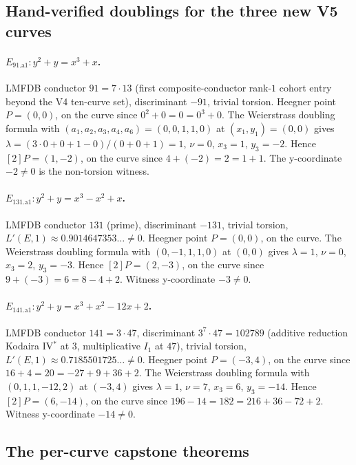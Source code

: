 \documentclass[11pt,a4paper]{article}
\theoremstyle{plain}
\theoremstyle{definition}
\theoremstyle{remark}
\begin{document}
\subsection{Hand-verified doublings for the three new V5 curves}

\paragraph{$E_{91.\mathrm{a}1}\colon y^{2} + y = x^{3} + x$.}
LMFDB conductor $91 = 7 \cdot 13$ (first composite-conductor
rank-$1$ cohort entry beyond the V4 ten-curve set), discriminant
$-91$, trivial torsion. Heegner point $P = (0, 0)$, on the curve
since $0^{2} + 0 = 0 = 0^{3} + 0$. The Weierstrass doubling formula
with $(a_{1}, a_{2}, a_{3}, a_{4}, a_{6}) = (0, 0, 1, 1, 0)$ at
$(x_{1}, y_{1}) = (0, 0)$ gives
$\lambda = (3\cdot 0 + 0 + 1 - 0)/(0 + 0 + 1) = 1$, $\nu = 0$,
$x_{3} = 1$, $y_{3} = -2$. Hence $[2]P = (1, -2)$, on the curve
since $4 + (-2) = 2 = 1 + 1$. The y-coordinate $-2 \ne 0$ is the
non-torsion witness.

\paragraph{$E_{131.\mathrm{a}1}\colon y^{2} + y = x^{3} - x^{2} + x$.}
LMFDB conductor $131$ (prime), discriminant $-131$, trivial torsion,
$L'(E, 1) \approx 0.9014647353\ldots \ne 0$. Heegner point
$P = (0, 0)$, on the curve. The Weierstrass doubling formula with
$(0, -1, 1, 1, 0)$ at $(0, 0)$ gives $\lambda = 1$, $\nu = 0$,
$x_{3} = 2$, $y_{3} = -3$. Hence $[2]P = (2, -3)$, on the curve
since $9 + (-3) = 6 = 8 - 4 + 2$. Witness y-coordinate $-3 \ne 0$.

\paragraph{$E_{141.\mathrm{a}1}\colon
            y^{2} + y = x^{3} + x^{2} - 12x + 2$.}
LMFDB conductor $141 = 3 \cdot 47$, discriminant $3^{7} \cdot 47 =
102789$ (additive reduction Kodaira IV$^{*}$ at $3$, multiplicative
$I_{1}$ at $47$), trivial torsion, $L'(E, 1) \approx 0.7185501725\ldots
\ne 0$. Heegner point $P = (-3, 4)$, on the curve since
$16 + 4 = 20 = -27 + 9 + 36 + 2$. The Weierstrass doubling formula
with $(0, 1, 1, -12, 2)$ at $(-3, 4)$ gives $\lambda = 1$,
$\nu = 7$, $x_{3} = 6$, $y_{3} = -14$. Hence $[2]P = (6, -14)$, on
the curve since $196 - 14 = 182 = 216 + 36 - 72 + 2$. Witness
y-coordinate $-14 \ne 0$.

\subsection{The per-curve capstone theorems}
\end{document}
